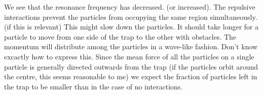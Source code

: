 We see that the resonance frequency has decreased. (or
increased). The repulsive interactions prevent the particles from occupying the same region simultaneously. (if this is relevant) This might slow down the particles. It should take longer for
a particle to move from one side of the trap to the other with obstacles. The momentum will distribute among the particles in a wave-like fashion. Don't know excactly how to
express this.
\newline
Since the mean force of all the particles on a single particle is generally directed outwards from the trap
(if the particles orbit around the centre, this seems reasonable to me) we expect the fraction
of particles left in the trap to be smaller than in the case of no interactions.

